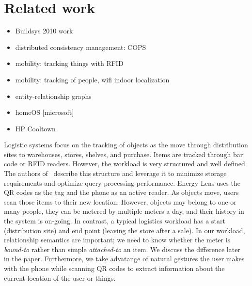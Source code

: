 \section{Related work}

\begin{itemize}
\item Buildsys 2010 work~\cite{hbci}
\item distributed consistency management: COPS
\item mobility: tracking things with RFID~\cite{rfid_gonz2006}
\item mobility: tracking of people, wifi indoor localization
\item entity-relationship graphs
\item homeOS [microsoft]
\item HP Cooltown~\cite{cooltown}
\end{itemize}

Logistic systems focus on the tracking of objects as the move through distribution sites to warehouses, stores, shelves,
and purchase.  Items are tracked through bar code or RFID readers.  However, the workload is very structured and well
defined.  The authors of~\cite{rfid_gonz2006} describe this structure and leverage it to minimize storage
requirements and optimize query-processing performance.  Energy Lens uses the QR codes as the tag and the phone as an active
reader.  As objects move, users scan those items to their new location.  However, objects may belong to one or
many people, they can be metered by multiple meters a day, and their history in the system
is on-going.  In contrast, a typical logistics workload has a start (distribution site) and end point (leaving the store
after a sale).  In our workload, relationship semantics are important; we need to know whether the meter is \emph{bound-to}
rather than simple \emph{attached-to} an item.  We discuss the difference later in the paper.
Furthermore, we take advatange of natural gestures the user makes with the phone while scanning QR codes to extract
information about the current location of the user or things.

